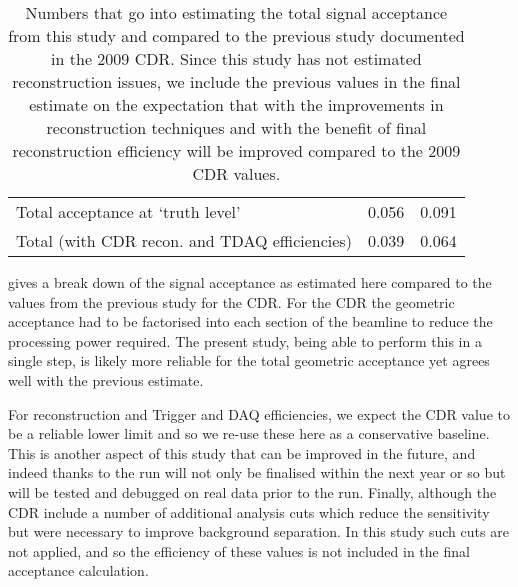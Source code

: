 \begin{table}[tb]
\begin{tabular}{lll}
\hline
\hline
Total acceptance at `truth level'                      & 0.056                     & 0.091      \\ 
Total (with CDR recon. and TDAQ efficiencies)          & 0.039                     & 0.064      \\ 
\hline                                                                                                       
\end{tabular}
\caption{
Numbers that go into estimating the total signal acceptance from this study and compared to the previous study documented in the 2009 CDR.
Since this study has not estimated reconstruction issues, we include the previous values in the final estimate on the expectation 
that with the improvements in reconstruction techniques and with the benefit of \phaseI final reconstruction efficiency will be improved compared to the 2009 CDR values.
        }
\end{table}
 gives a break down of the signal acceptance as estimated here compared to the values from the previous study for the CDR.
For the CDR the geometric acceptance had to be factorised into each section of the beamline to reduce the processing power required.  
The present study, being able to perform this in a single step, is likely more reliable for the total geometric acceptance yet agrees well with the previous estimate.

For reconstruction and Trigger and DAQ efficiencies, we expect the CDR value to be a reliable lower limit and so we re-use these here as a conservative baseline.
This is another aspect of this study that can be improved in the future, and indeed thanks to the \phaseI run will not only be finalised within the next year or so but will be tested and debugged on real data prior to the \phaseII run.
Finally, although the CDR include a number of additional analysis cuts which reduce the sensitivity but were necessary to improve background separation.
In this study such cuts are not applied, and so the efficiency of these values is not included in the final acceptance calculation.

